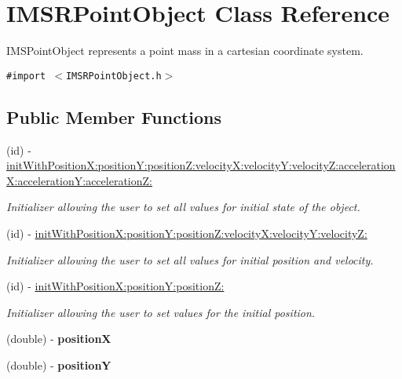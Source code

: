\hypertarget{interface_i_m_s_r_point_object}{
\section{IMSRPointObject Class Reference}
\label{interface_i_m_s_r_point_object}
}
IMSPointObject represents a point mass in a cartesian coordinate system.  


{\tt \#import $<$IMSRPointObject.h$>$}

\subsection*{Public Member Functions}
\begin{CompactItemize}
\item 
(id) - \hyperlink{interface_i_m_s_r_point_object_0251ecd091ae3e8a0840a6b6ab35be0b}{initWithPositionX:positionY:positionZ:velocityX:velocityY:velocityZ:accelerationX:accelerationY:accelerationZ:}
\begin{CompactList}\small\item\em Initializer allowing the user to set all values for initial state of the object. \item\end{CompactList}\item 
(id) - \hyperlink{interface_i_m_s_r_point_object_4ed4386983dba714a6678023ac353199}{initWithPositionX:positionY:positionZ:velocityX:velocityY:velocityZ:}
\begin{CompactList}\small\item\em Initializer allowing the user to set all values for initial position and velocity. \item\end{CompactList}\item 
(id) - \hyperlink{interface_i_m_s_r_point_object_603d5f56f6b9344693f108efa3786d79}{initWithPositionX:positionY:positionZ:}
\begin{CompactList}\small\item\em Initializer allowing the user to set values for the initial position. \item\end{CompactList}\item 
\hypertarget{interface_i_m_s_r_point_object_ddb88a4b481defa5b3b7729df3bb57f8}{
(double) - \textbf{positionX}}
\label{interface_i_m_s_r_point_object_ddb88a4b481defa5b3b7729df3bb57f8}

\item 
\hypertarget{interface_i_m_s_r_point_object_f637e44f6254cc47cfbf81d56f15994c}{
(double) - \textbf{positionY}}
\label{interface_i_m_s_r_point_object_f637e44f6254cc47cfbf81d56f15994c}


\end{CompactItemize}

